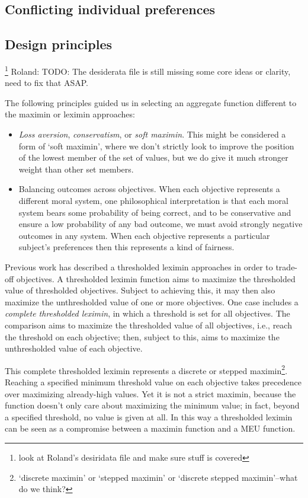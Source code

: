 \subsection{Conflicting individual preferences}

\subsection{Design principles}\footnote{look at Roland's desiridata file and make sure stuff is covered}
Roland: TODO: The desiderata file is still missing some core ideas or clarity, need to fix that ASAP.

The following principles guided us in selecting an aggregate function different to the maximin or leximin approaches:
\begin{itemize}
    \item \textit{Loss aversion}, \textit{conservatism}, or \textit{soft maximin}. This might be considered a form of `soft maximin', where we don't strictly look to improve the position of the lowest member of the set of values, but we do give it much stronger weight than other set members.
    \item Balancing outcomes across objectives. When each objective represents a different moral system, one philosophical interpretation is that each moral system bears some probability of being correct, and to be conservative and ensure a low probability of any bad outcome, we must avoid strongly negative outcomes in any system. When each objective represents a particular subject's preferences then this represents a kind of fairness.
\end{itemize}

Previous work \cite{vamplew_potential-based_2021} has described a thresholded leximin approaches in order to trade-off objectives. A thresholded leximin function aims to maximize the thresholded value of thresholded objectives. Subject to achieving this, it may then also maximize the unthresholded value of one or more objectives. One case includes a \textit{complete thresholded leximin}, in which a threshold is set for all objectives. The comparison aims to maximize the thresholded value of all objectives, i.e., reach the threshold on each objective; then, subject to this, aims to maximize the unthresholded value of each objective.

This complete thresholded leximin represents a discrete or stepped maximin\footnote{`discrete maximin' or `stepped maximin' or `discrete stepped maximin'--what do we think?}. Reaching a specified minimum threshold value on each objective takes precedence over maximizing already-high values. Yet it is not a strict maximin, because the function doesn't only care about maximizing the minimum value; in fact, beyond a specified threshold, no value is given at all. In this way a thresholded leximin can be seen as a compromise between a maximin function and a MEU function.

